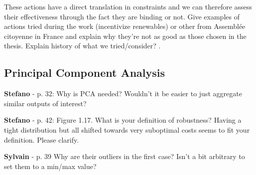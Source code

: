 \documentclass[12pt,a4paper]{article}
\begin{document}
\noindent These actions have a direct translation in constraints and we can therefore assess their effectiveness through the fact they are binding or not. Give examples of actions tried during the work (incentivize renewables) or other from Assemblée citoyenne in France and explain why they’re not as good as those chosen in the thesis. Explain history of what we tried/consider? 
 {\color{blue} }.

\begin{mdframed}[style=manuscript] %

\end{mdframed}

\subsection{Principal Component Analysis}
\label{methodo_PCA}

\begin{mdframed}[style=comment] %
{\color{orange} \textbf{Stefano}} - p. 32: Why is PCA needed? Wouldn’t it be easier to just aggregate similar outputs of interest?
\end{mdframed}

\noindent 

\begin{mdframed}[style=manuscript] %

\end{mdframed}

\begin{mdframed}[style=comment] %
{\color{orange} \textbf{Stefano}} - p. 42: Figure 1.17. What is your definition of robustness? Having a tight distribution but all shifted towards very suboptimal costs seems to fit your definition. Please clarify.
\end{mdframed}

\noindent 

\begin{mdframed}[style=manuscript] %

\end{mdframed}

\begin{mdframed}[style=comment] %
{\color{purple} \textbf{Sylvain}} - p. 39 Why are their outliers in the first case? Isn't a bit arbitrary to set them to a min/max value?
\end{mdframed}
\end{document}

